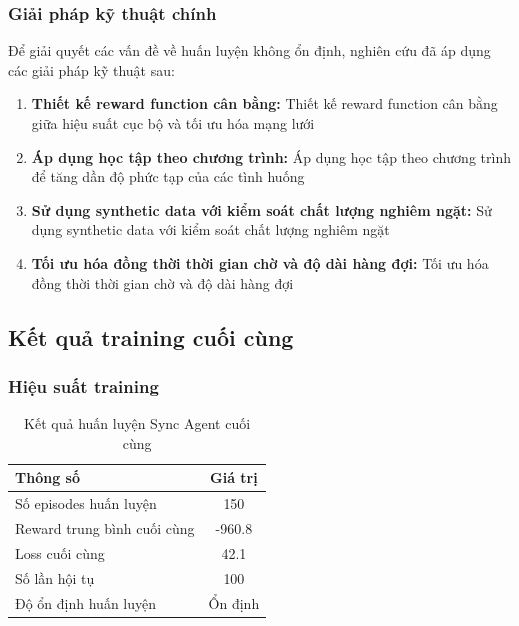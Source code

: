 \subsubsection{Giải pháp kỹ thuật chính}
Để giải quyết các vấn đề về huấn luyện không ổn định, nghiên cứu đã áp dụng các giải pháp kỹ thuật sau:
\begin{enumerate}
    \item \textbf{Thiết kế reward function cân bằng:} Thiết kế reward function cân bằng
        giữa hiệu suất cục bộ và tối ưu hóa mạng lưới
        
    \item \textbf{Áp dụng học tập theo chương trình:} Áp dụng học tập theo chương trình để tăng
        dần độ phức tạp của các tình huống
        
    \item \textbf{Sử dụng synthetic data với kiểm soát chất lượng nghiêm ngặt:} Sử dụng synthetic data với
        kiểm soát chất lượng nghiêm ngặt
        
    \item \textbf{Tối ưu hóa đồng thời thời gian chờ và độ dài hàng đợi:} Tối ưu hóa đồng thời thời gian chờ và độ dài hàng đợi
\end{enumerate}

\subsection{Kết quả training cuối cùng}

\subsubsection{Hiệu suất training}
\begin{table}[!htp]
    \centering
    \caption{Kết quả huấn luyện Sync Agent cuối cùng}
    \label{tab:sync_final_training}
    \begin{tabular}{@{}lc@{}}
        \toprule \textbf{Thông số}      & \textbf{Giá trị}       \\
        \midrule Số episodes huấn luyện     & 150                    \\
        Reward trung bình cuối cùng          & -960.8                 \\
        Loss cuối cùng                    & 42.1                   \\
        Số lần hội tụ           & 100                    \\
        Độ ổn định huấn luyện            & Ổn định                \\
        \bottomrule
    \end{tabular}
\end{table}


